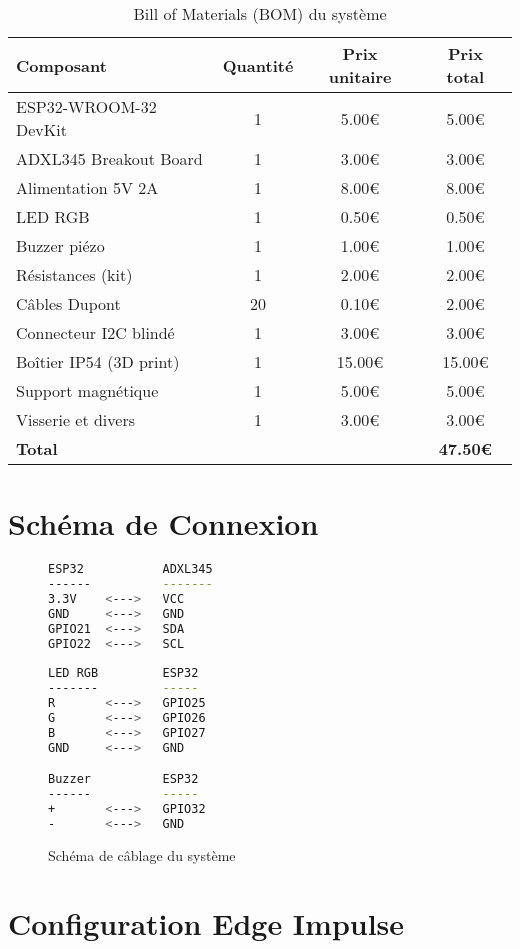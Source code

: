 \begin{table}[h]
\centering
\caption{Bill of Materials (BOM) du système}
\begin{tabular}{lccc}
\toprule
\textbf{Composant} & \textbf{Quantité} & \textbf{Prix unitaire} & \textbf{Prix total} \\
\midrule
ESP32-WROOM-32 DevKit & 1 & 5.00€ & 5.00€ \\
ADXL345 Breakout Board & 1 & 3.00€ & 3.00€ \\
Alimentation 5V 2A & 1 & 8.00€ & 8.00€ \\
LED RGB & 1 & 0.50€ & 0.50€ \\
Buzzer piézo & 1 & 1.00€ & 1.00€ \\
Résistances (kit) & 1 & 2.00€ & 2.00€ \\
Câbles Dupont & 20 & 0.10€ & 2.00€ \\
Connecteur I2C blindé & 1 & 3.00€ & 3.00€ \\
Boîtier IP54 (3D print) & 1 & 15.00€ & 15.00€ \\
Support magnétique & 1 & 5.00€ & 5.00€ \\
Visserie et divers & 1 & 3.00€ & 3.00€ \\
\midrule
\textbf{Total} & & & \textbf{47.50€} \\
\bottomrule
\end{tabular}
\end{table}

\section{Schéma de Connexion}

\begin{figure}[h]
\centering
\begin{lstlisting}[language=bash, caption=Connexions I2C ESP32-ADXL345]
ESP32           ADXL345
------          -------
3.3V    <--->   VCC
GND     <--->   GND
GPIO21  <--->   SDA
GPIO22  <--->   SCL
        
LED RGB         ESP32
-------         -----
R       <--->   GPIO25
G       <--->   GPIO26
B       <--->   GPIO27
GND     <--->   GND

Buzzer          ESP32
------          -----
+       <--->   GPIO32
-       <--->   GND
\end{lstlisting}
\caption{Schéma de câblage du système}
\end{figure}

\section{Configuration Edge Impulse}

